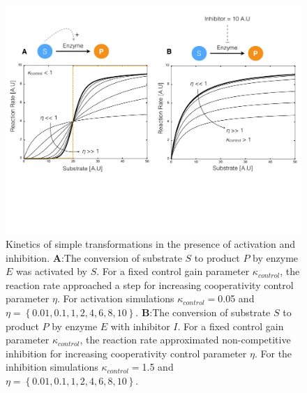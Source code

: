 \documentclass[processes,article,accept,moreauthors,pdftex,12pt,a4paper]{mdpi}
\begin{document}
\begin{figure}[H]
\centering
\includegraphics[width=1.0\textwidth]{./figs/Figure-3-EnzymeKinetics.pdf}
\caption{Kinetics of simple transformations in the presence of activation and inhibition. 
\textbf{A}:The conversion of substrate $S$ to product $P$ by enzyme $E$ was activated by $S$. 
For a fixed control gain parameter $\kappa_{control}$, the reaction rate approached a step for increasing cooperativity control parameter $\eta$. 
For activation simulations $\kappa_{control}=$0.05 and $\eta=\left\{0.01,0.1,1,2,4,6,8,10\right\}$.
\textbf{B}:The conversion of substrate $S$ to product $P$ by enzyme $E$ with inhibitor $I$. 
For a fixed control gain parameter $\kappa_{control}$, the reaction rate approximated non-competitive inhibition for increasing cooperativity control parameter $\eta$. 
For the inhibition simulations $\kappa_{control}=$1.5 and $\eta=\left\{0.01,0.1,1,2,4,6,8,10\right\}$.}\label{fig-kinetics-simulations}
\end{figure}
    
\end{document}
